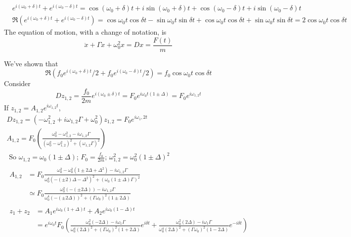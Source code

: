 \documentclass[twoside,10pt]{amsart}
\newcommand{\problemhead}[1]
  {\smallskip
   \noindent{\large\bf Problem #1.}
   \smallskip}
\begin{document}
\problemhead{2.3} 
\[
\begin{aligned}
  & e^{ i(\omega_0 + \delta )t } + e^{ i (\omega_0 -\delta )t } = \cos{ (\omega_0 + \delta) t } + i \sin{ (\omega_0 + \delta)t } + \cos{ (\omega_0 -\delta ) t } + i \sin{ (\omega_0 -\delta)t }  \\
  & \Re ( e^{ i(\omega_0 + \delta )t } + e^{ i (\omega_0 -\delta )t } ) = \cos{ \omega_0 t } \cos{ \delta t} - \sin{ \omega_0 t } \sin{\delta t} + \cos{ \omega_0 t } \cos{ \delta t } + \sin{\omega_0 t} \sin{\delta t } = 2 \cos{\omega_0 t } \cos{\delta t }
\end{aligned}
\]
The equation of motion, with a change of notation, is 
\[
\ddot{x} + \Gamma \dot{x} + \omega_0^2 x = Dx = \frac{ F(t)}{m}
\]

We've shown that 
\[
 \Re ( f_0 e^{ i(\omega_0 + \delta )t }/2 + f_0 e^{ i (\omega_0 -\delta )t }/2 ) = f_0 \cos{\omega_0 t } \cos{\delta t }
\]
Consider
\[
D z_{1,2} = \frac{ f_0 }{2m} e^{i (\omega_0 \pm \delta) t } = F_0 e^{ i \omega_0 t (1 \pm \Delta) } = F_0 e^{i\omega_{1,2} t }  
\]
If $z_{1,2} = A_{1,2} e^{i \omega_{1,2} t }  $, 
\[
\begin{gathered}
  Dz_{1,2} = (-\omega_{1,2}^2 + i \omega_{1,2} \Gamma + \omega_0^2 ) z_{1,2} = F_0 e^{i\omega_1,2 t }  \\
  A_{1,2} = F_0 \left( \frac{ \omega_0^2 - \omega_{1,2}^2 - i \omega_{1,2} \Gamma}{ (\omega_0^2 - \omega_{1,2}^2 )^2 + (\omega_{1,2} \Gamma )^2 }  \right) \\
  \text{ So } \omega_{1,2} = \omega_0 (1 \pm \Delta); \, F_0 = \frac{f_0}{2m} ; \, \omega_{1,2}^2 = \omega_0^2 (1 \pm \Delta)^2  \\
  \begin{aligned}
    A_{1,2} & = F_0 \frac{ \omega_0^2 - \omega_0^2 (1 \pm 2 \Delta + \Delta^2 ) - i \omega_{1,2} \Gamma }{ \omega_0^4 ( - (\pm 2) \Delta - \Delta^2 )^2  + (\omega_0 (1 \pm \Delta) \Gamma)^2 }   \\
    & \simeq F_0 \frac{ \omega_0^2 ( -( \pm 2 \Delta)) - i \omega_{1,2} \Gamma }{ \omega_0^4 ( - (\pm 2 \Delta))^2 + (\Gamma \omega_0)^2 (1 \pm 2 \Delta ) }  
  \end{aligned}  \\
  \begin{aligned} 
  z_1 + z_2 & = A_1 e^{ i \omega_0 (1 + \Delta) t } + A_2 e^{ i \omega_0 (1 - \Delta)t }  \\
  & = e^{i\omega_0 t } F_0 \left( \frac{ \omega_0^2 ( -2 \Delta ) - i \omega_1 \Gamma }{ \omega_0^4 (2 \Delta)^2 + (\Gamma \omega_0 )^2 ( 1 + 2 \Delta ) } e^{i\delta t } +  \frac{ \omega_0^2 ( 2 \Delta ) - i \omega_1 \Gamma }{ \omega_0^4 (2 \Delta)^2 + (\Gamma \omega_0 )^2 ( 1 - 2 \Delta ) } e^{-i\delta t } \right)   
  \end{aligned}
\end{gathered}
\]
\end{document}
